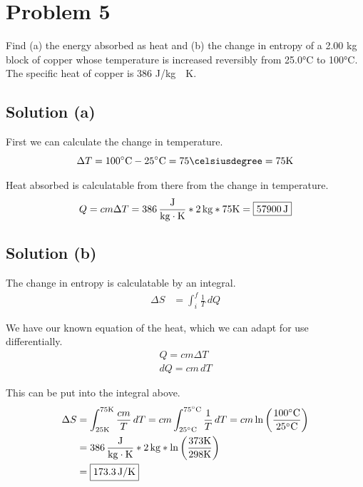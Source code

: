 \documentclass[12pt]{article}
\begin{document}
    \pagebreak
    \section{Problem 5}
        Find (a) the energy absorbed as heat and (b) the change in entropy of a 2.00 kg block of copper whose temperature is increased reversibly from 25.0\unit{\celsius} to 100\unit{\celsius}. 
        The specific heat of copper is 386 \unit{\joule/\kilo\gram\cdot\kelvin}.

        \subsection{Solution (a)}
            First we can calculate the change in temperature.
            \begin{equation}
                \Delta T    =   100\unit{\celsius} - 25\unit{\celsius}
                    =   75\unit{\celsiusdegree}
                    =   75\unit{\kelvin}
            \end{equation}

            Heat absorbed is calculatable from there from the change in temperature.
            \begin{equation}
                Q   =   cm\Delta T
                    =   386\,\unit{\frac{\joule}{\kilo\gram\cdot\kelvin}} * 2\,\unit{\kilo\gram} * 75\unit{\kelvin}
                    =   \boxed{57900\,\unit{\joule}}
            \end{equation}

        \subsection{Solution (b)}
        The change in entropy is calculatable by an integral.
        \begin{align}
            \Delta S    &=  \int_{i}^{f}\frac{1}{T}\,dQ
        \end{align}

        We have our known equation of the heat, which we can adapt for use differentially.
        \begin{gather}
            Q   =   cm\Delta T\\
            dQ  =   cm\,dT
        \end{gather}

        This can be put into the integral above.
        \begin{align}
            \Delta S    &=  \int_{25\unit{\kelvin}}^{75\unit{\kelvin}}\frac{cm}{T}\,dT
                =   cm \int_{25\unit{\celsius}}^{75\unit{\celsius}}\frac{1}{T}\,dT
                =   cm\ln\left( \frac{100\unit{\celsius}}{25\unit{\celsius}} \right)\\
                &=  386\,\unit{\frac{\joule}{\kilo\gram\cdot\kelvin}} * 2\,\unit{\kilo\gram} * \ln\left( \frac{373\unit{\kelvin}}{298\unit{\kelvin}} \right)\\
                &=  \boxed{173.3\,\unit{\joule/\kelvin}}
        \end{align}
\end{document}
